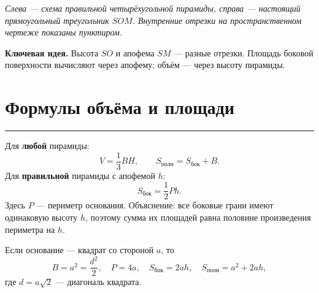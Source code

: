 \documentclass[a4paper,12pt]{article}
\newcommand{\sect}[1]{\section{#1}\vspace{-1.5mm}\noindent\color{accent}\rule{\linewidth}{0.45pt}\color{textgray}\vspace{2mm}}
\newcommand{\keyidea}[1]{\par\textcolor{darkaccent}{\textbf{Ключевая идея.}} #1\par}
\begin{document}
\begin{center}
\begin{minipage}[c]{.54\linewidth}\centering
{}
\end{minipage}\hfill
\begin{minipage}[c]{.43\linewidth}\centering
{}
\end{minipage}
\end{center}
\smallskip
\textit{Слева --- схема правильной четырёхугольной пирамиды, справа --- настоящий прямоугольный треугольник \(SOM\). Внутренние отрезки на пространственном чертеже показаны пунктиром.}

\keyidea{Высота \(SO\) и апофема \(SM\) --- разные отрезки. Площадь боковой поверхности вычисляют через апофему; объём --- через высоту пирамиды.}

\sect{Формулы объёма и площади}
Для \textbf{любой} пирамиды:
\[
\boxed{V=\frac13 BH},\qquad
\boxed{S_{\text{полн}}=S_{\text{бок}}+B}.
\]
Для \textbf{правильной} пирамиды с апофемой \(h\):
\[
\boxed{S_{\text{бок}}=\frac12 Ph}.
\]
Здесь \(P\) --- периметр основания. Объяснение: все боковые грани имеют одинаковую высоту \(h\), поэтому сумма их площадей равна половине произведения периметра на \(h\).

Если основание --- квадрат со стороной \(a\), то
\[
B=a^2=\frac{d^2}{2},\quad P=4a,\quad
\boxed{S_{\text{бок}}=2ah},\quad
\boxed{S_{\text{полн}}=a^2+2ah},
\]
где \(d=a\sqrt2\) --- диагональ квадрата.
\end{document}
